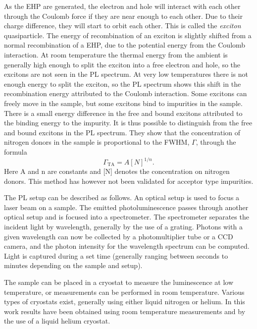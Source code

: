 As the EHP are generated, the electron and hole will interact with each other through the Coulomb force if they are near enough to each other. Due to their charge difference, they will start to orbit each other. This is called the \emph{exciton} quasiparticle. The energy of recombination of an exciton is slightly shifted from a normal recombination of a EHP, due to the potential energy from the Coulomb interaction. At room temperature the thermal energy from the ambient is generally high enough to split the exciton into a free electron and hole, so the excitons are not seen in the PL spectrum. At very low temperatures there is not enough energy to split the exciton, so the PL spectrum shows this shift in the recombination energy attributed to the Coulomb interaction. Some excitons can freely move in the sample, but some excitons bind to impurities in the sample. There is a small energy difference in the free and bound excitons attributed to the binding energy to the impurity. It is thus possible to distinguish from the free and bound excitons in the PL spectrum. They show that the concentration of nitrogen donors in the sample is proportional to the FWHM, $\Gamma$, through the formula
\begin{equation}
\label{eq:fwhm}
\Gamma_\mathrm{TA} = A[N]^{1/n}.
\end{equation}
Here A and n are constants and [N] denotes the concentration on nitrogen donors. This method has however not been validated for acceptor type impurities. 

The PL setup can be described as follows. An optical setup is used to focus a laser beam on a sample. The emitted photoluminescence passes through another optical setup and is focused into a spectrometer. The spectrometer separates the incident light by wavelength, generally by the use of a grating. Photons with a given wavelength can now be collected by a photomultiplier tube or a CCD camera, and the photon intensity for the wavelength spectrum can be computed. Light is captured during a set time (generally ranging between seconds to minutes depending on the sample and setup). 

The sample can be placed in a cryostat to measure the luminescence at low temperature, or measurements can be performed in room temperature. Various types of cryostats exist, generally using either liquid nitrogen or helium. In this work results have been obtained using room temperature measurements and by the use of a liquid helium cryostat. 






































